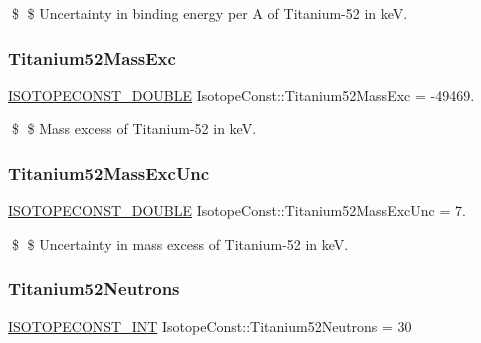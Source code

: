 \$ \$ Uncertainty in binding energy per A of Titanium-\/52 in keV. \mbox{\label{group___isotope_const-_titanium-_ti52_gad12bb8a514d8633e8bcf864705cbef83}} 
\subsubsection{\texorpdfstring{Titanium52\+Mass\+Exc}{Titanium52MassExc}}
{\footnotesize\ttfamily \mbox{\hyperlink{group___isotope_const-_macros_ga8f45a7272ce02c0b4c65c44636ed719a}{I\+S\+O\+T\+O\+P\+E\+C\+O\+N\+S\+T\+\_\+\+D\+O\+U\+B\+LE}} Isotope\+Const\+::\+Titanium52\+Mass\+Exc = -\/49469.}

\$ \$ Mass excess of Titanium-\/52 in keV. \mbox{\label{group___isotope_const-_titanium-_ti52_ga4ad49ee9024bb890c9b716d88fa01e1a}} 
\subsubsection{\texorpdfstring{Titanium52\+Mass\+Exc\+Unc}{Titanium52MassExcUnc}}
{\footnotesize\ttfamily \mbox{\hyperlink{group___isotope_const-_macros_ga8f45a7272ce02c0b4c65c44636ed719a}{I\+S\+O\+T\+O\+P\+E\+C\+O\+N\+S\+T\+\_\+\+D\+O\+U\+B\+LE}} Isotope\+Const\+::\+Titanium52\+Mass\+Exc\+Unc = 7.}

\$ \$ Uncertainty in mass excess of Titanium-\/52 in keV. \mbox{\label{group___isotope_const-_titanium-_ti52_gafe653b543869d716d9855cdbb99eba44}} 
\subsubsection{\texorpdfstring{Titanium52\+Neutrons}{Titanium52Neutrons}}
{\footnotesize\ttfamily \mbox{\hyperlink{group___isotope_const-_macros_ga5f18360b3e99483a35c32d789e62621c}{I\+S\+O\+T\+O\+P\+E\+C\+O\+N\+S\+T\+\_\+\+I\+NT}} Isotope\+Const\+::\+Titanium52\+Neutrons = 30}

